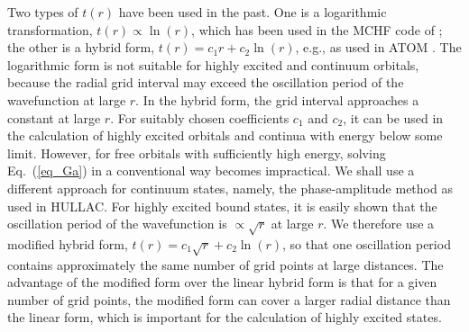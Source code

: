 Two types of $t(r)$ have been used in the past. One is a logarithmic
transformation, $t(r) \propto \ln(r)$, which has been used in the MCHF code of
\citet{fischer00}; the other is a hybrid form, $t(r) = c_1 r + c_2 \ln(r)$,
e.g., as used in ATOM \cite{amusia97}. The logarithmic form is not
suitable for 
highly excited and continuum orbitals, because the radial grid interval may
exceed the oscillation period of the wavefunction at large $r$. In the hybrid
form, the grid interval approaches a constant at large $r$. For suitably
chosen coefficients $c_1$ and $c_2$, it can be used in the calculation of
highly excited orbitals and continua with energy below some limit. However,
for free orbitals with sufficiently high energy, solving Eq.~(\ref{eq_Ga})
in a conventional way becomes impractical. We shall use a different approach
for continuum states, namely, the phase-amplitude method as used in
HULLAC. For highly excited bound states, it is easily shown that the
oscillation period of the 
wavefunction is $\propto \sqrt{r}$ at large $r$. We therefore use a modified
hybrid form, $t(r) = c_1\sqrt{r} + c_2\ln(r)$, so that 
one oscillation period contains approximately the same number of grid points
at large distances. The advantage of the modified form
over the linear hybrid form is that for a given number of grid points, the
modified form can cover a larger radial distance than the linear form, which is
important for the calculation of highly excited states. 

